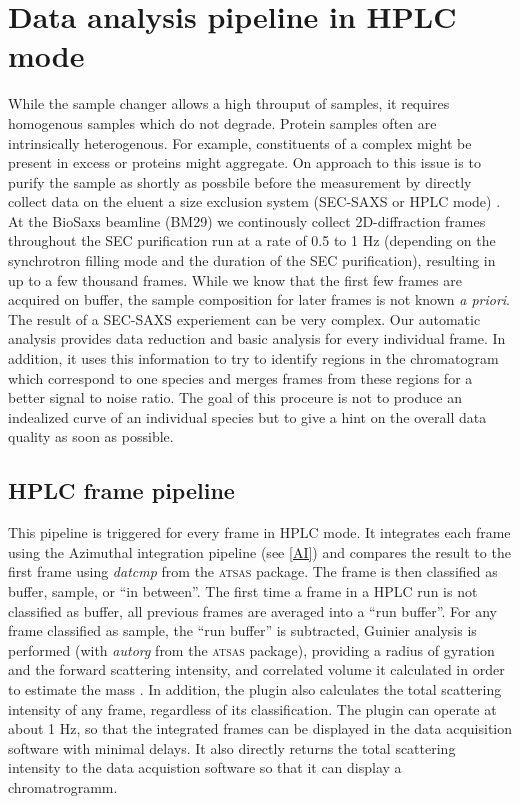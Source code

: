 \documentclass[preprint,pdf]{iucr}              %
\begin{document}
\section{Data analysis pipeline in HPLC mode}
While the sample changer allows a high throuput of samples, it requires
homogenous samples which do not degrade. 
Protein samples often are intrinsically heterogenous. 
For example, constituents of a complex might be present in excess or proteins
might aggregate.  
On approach to this issue is to purify the sample as shortly as possbile before 
the measurement by directly collect data on the eluent a size exclusion system 
(SEC-SAXS or HPLC mode) \cite{SECBM29, otherSEC}. 
At the BioSaxs beamline (BM29) we continously collect 2D-diffraction frames
throughout the SEC purification run at a rate of 0.5 to 1 Hz 
(depending on the synchrotron filling mode and the duration of the SEC purification), 
resulting in up to a few thousand frames. 
While we know that the first few frames are acquired on buffer, the sample composition 
for later frames is not known \textit{a priori}. 
The result of a SEC-SAXS experiement can be very complex. 
Our automatic analysis provides data reduction and basic analysis for every
individual frame. 
In addition, it uses this information to try to identify regions in the
chromatogram which correspond to one species and merges frames from these
regions for a better signal to noise ratio. 
The goal of this proceure is not to produce an indealized curve of an individual
species but to give a hint on the overall data quality as soon as possible.

\subsection{HPLC frame pipeline}

This pipeline is triggered for every frame in HPLC mode. 
It integrates each frame using the Azimuthal integration pipeline (see \ref{AI})
and compares the result to the first frame using \textit{datcmp} from the
\textsc{atsas} package. 
The frame is then classified as buffer, sample, or ``in between''. 
The first time a frame in a HPLC run is not classified as buffer, all previous
frames are averaged into a ``run buffer''. 
For any frame classified as sample, the ``run buffer'' is subtracted, Guinier
analysis is performed (with \textit{autorg} from the \textsc{atsas} package), 
providing a radius of gyration and the forward scattering intensity, and
correlated volume it calculated in order to estimate the mass
\cite{RamboTainerNature2013}. 
In addition, the plugin also calculates the total scattering intensity of any
frame, regardless of its classification.
The plugin can operate at about 1 Hz, so that the integrated frames can be
displayed in the data acquisition software with minimal delays. 
It also directly returns the total scattering intensity to the data acquistion
software so that it can display a chromatrogramm. 
\end{document}
